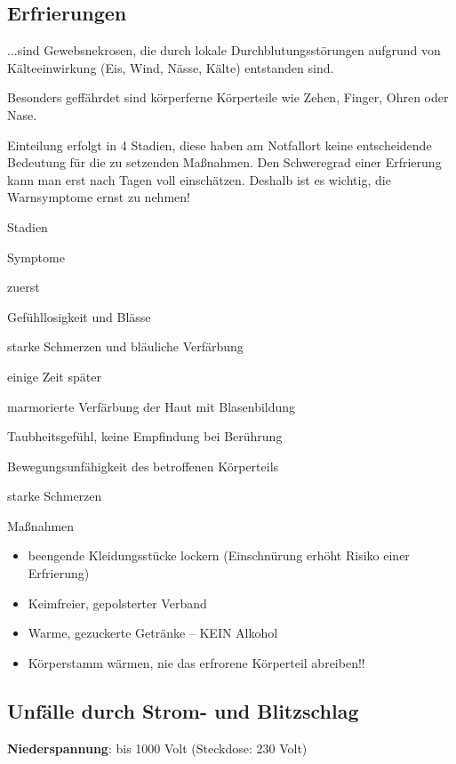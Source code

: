 \documentclass{article}
\newcommand\gT[1]{\textbf{\textup{\textcolor[rgb]{0.0,0.5019608,0.0}{#1}}}}
\begin{document}
\subsection{Erfrierungen}
{\mdseries
...sind Gewebsnekrosen, die durch lokale  Durchblutungsst\"orungen
aufgrund von  K\"alteeinwirkung (Eis, Wind, N\"asse,  K\"alte)
entstanden sind.}

{\mdseries
Besonders geff\"ahrdet sind k\"orperferne K\"orperteile wie Zehen,
Finger, Ohren oder Nase.}

{\mdseries
Einteilung erfolgt in 4 Stadien, diese haben am Notfallort keine
entscheidende Bedeutung f\"ur die zu setzenden Ma{\ss}nahmen. Den
Schweregrad einer Erfrierung kann man erst nach Tagen voll
einsch\"atzen. Deshalb ist es wichtig, die Warnsymptome ernst zu
nehmen!}

Stadien

Symptome

zuerst 

Gef\"uhllosigkeit und Bl\"asse

starke Schmerzen und bl\"auliche Verf\"arbung

 einige Zeit sp\"ater

marmorierte Verf\"arbung der Haut mit  Blasenbildung

Taubheitsgef\"uhl, keine Empfindung bei  Ber\"uhrung

Bewegungsunf\"ahigkeit des betroffenen  K\"orperteils

starke Schmerzen

{\mdseries\color{black}
Ma{\ss}nahmen}

\begin{itemize}
\item {\mdseries\color[rgb]{0.0,0.0,0.5019608}
beengende Kleidungsst\"ucke lockern (Einschn\"urung erh\"oht Risiko
einer Erfrierung)}

\item {\mdseries\color[rgb]{0.0,0.0,0.5019608}
Keimfreier, gepolsterter Verband}

\item {\mdseries\color[rgb]{0.0,0.0,0.5019608}
Warme, gezuckerte Getr\"anke -- KEIN Alkohol}

\item {\mdseries\color[rgb]{0.0,0.0,0.5019608}
K\"orperstamm w\"armen, nie das erfrorene K\"orperteil abreiben!!}

\end{itemize}
\subsection{Unf\"alle durch Strom- und Blitzschlag}
{\mdseries
\gT{Niederspannung}: bis 1000 Volt (Steckdose:  230
Volt)}
\end{document}
